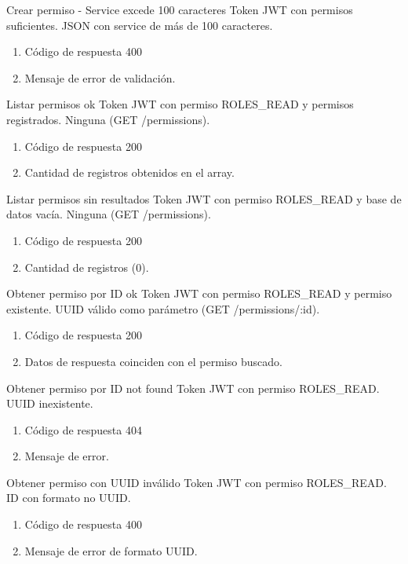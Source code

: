{Crear permiso - Service excede 100 caracteres}
{Token JWT con permisos suficientes.}
{JSON con service de más de 100 caracteres.}
{\begin{enumerate} [leftmargin=*, nosep]
    \item Código de respuesta 400
    \item Mensaje de error de validación.
\end{enumerate}}

{Listar permisos ok}
{Token JWT con permiso ROLES\_READ y permisos registrados.}
{Ninguna (GET /permissions).}
{\begin{enumerate} [leftmargin=*, nosep]
    \item Código de respuesta 200
    \item Cantidad de registros obtenidos en el array.
\end{enumerate}}

{Listar permisos sin resultados}
{Token JWT con permiso ROLES\_READ y base de datos vacía.}
{Ninguna (GET /permissions).}
{\begin{enumerate} [leftmargin=*, nosep]
    \item Código de respuesta 200
    \item Cantidad de registros (0).
\end{enumerate}}

{Obtener permiso por ID ok}
{Token JWT con permiso ROLES\_READ y permiso existente.}
{UUID válido como parámetro (GET /permissions/:id).}
{\begin{enumerate} [leftmargin=*, nosep]
    \item Código de respuesta 200
    \item Datos de respuesta coinciden con el permiso buscado.
\end{enumerate}}

{Obtener permiso por ID not found}
{Token JWT con permiso ROLES\_READ.}
{UUID inexistente.}
{\begin{enumerate} [leftmargin=*, nosep]
    \item Código de respuesta 404
    \item Mensaje de error.
\end{enumerate}}

{Obtener permiso con UUID inválido}
{Token JWT con permiso ROLES\_READ.}
{ID con formato no UUID.}
{\begin{enumerate} [leftmargin=*, nosep]
    \item Código de respuesta 400
    \item Mensaje de error de formato UUID.
\end{enumerate}}

